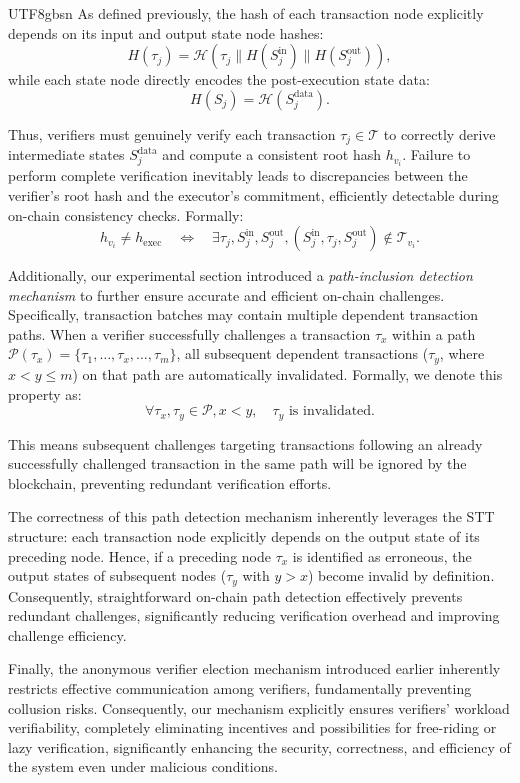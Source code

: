 \documentclass[runningheads]{llncs}
\begin{document}
\begin{CJK*}{UTF8}{gbsn}
As defined previously, the hash of each transaction node explicitly depends on its input and output state node hashes:
\[
H(\tau_j) = \mathcal{H}(\tau_j \parallel H(S_j^{\text{in}}) \parallel H(S_j^{\text{out}})),
\]
while each state node directly encodes the post-execution state data:
\[
H(S_j) = \mathcal{H}(S_j^{\text{data}}).
\]

Thus, verifiers must genuinely verify each transaction $\tau_j \in \mathcal{T}$ to correctly derive intermediate states $S_j^{\text{data}}$ and compute a consistent root hash $h_{v_i}$. Failure to perform complete verification inevitably leads to discrepancies between the verifier’s root hash and the executor's commitment, efficiently detectable during on-chain consistency checks. Formally:
\[
h_{v_i} \neq h_{\text{exec}} \quad \Longleftrightarrow \quad \exists \tau_j, S_j^{\text{in}}, S_j^{\text{out}}, (S_j^{\text{in}}, \tau_j, S_j^{\text{out}}) \notin \mathcal{T}_{v_i}.
\]

Additionally, our experimental section introduced a \textit{path-inclusion detection mechanism} to further ensure accurate and efficient on-chain challenges. Specifically, transaction batches may contain multiple dependent transaction paths. When a verifier successfully challenges a transaction $\tau_x$ within a path $\mathcal{P}(\tau_x)=\{\tau_1,\dots,\tau_x,\dots,\tau_m\}$, all subsequent dependent transactions ($\tau_y$, where $x<y \leq m$) on that path are automatically invalidated. Formally, we denote this property as:
\[
\forall \tau_x, \tau_y \in \mathcal{P}, x<y,\quad \tau_y \text{ is invalidated.}
\]

This means subsequent challenges targeting transactions following an already successfully challenged transaction in the same path will be ignored by the blockchain, preventing redundant verification efforts.

The correctness of this path detection mechanism inherently leverages the STT structure: each transaction node explicitly depends on the output state of its preceding node. Hence, if a preceding node $\tau_x$ is identified as erroneous, the output states of subsequent nodes ($\tau_y$ with $y>x$) become invalid by definition. Consequently, straightforward on-chain path detection effectively prevents redundant challenges, significantly reducing verification overhead and improving challenge efficiency.

Finally, the anonymous verifier election mechanism introduced earlier inherently restricts effective communication among verifiers, fundamentally preventing collusion risks. Consequently, our mechanism explicitly ensures verifiers' workload verifiability, completely eliminating incentives and possibilities for free-riding or lazy verification, significantly enhancing the security, correctness, and efficiency of the system even under malicious conditions.


\end{CJK*}
\end{document}
